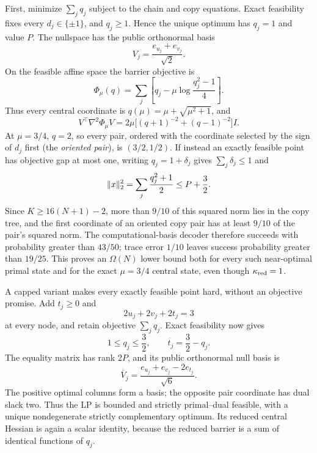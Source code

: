 First, minimize \(\sum_jq_j\) subject to the chain and copy equations.  Exact
feasibility fixes every \(d_j\in\{\pm1\}\), and \(q_j\geq1\).  Hence the
unique optimum has \(q_j=1\) and value \(P\).  The nullspace has the public
orthonormal basis
\begin{equation}
 V_j=\frac{e_{u_j}+e_{v_j}}{\sqrt2}.
\end{equation}
On the feasible affine space the barrier objective is
\begin{equation}
 \Phi_\mu(q)=\sum_j\left[q_j-
       \mu\log\frac{q_j^2-1}{4}\right].
\end{equation}
Thus every central coordinate is
\(q(\mu)=\mu+\sqrt{\mu^2+1}\), and
\begin{equation}
 V^\top\nabla^2\Phi_\mu V
 =2\mu\bigl[(q+1)^{-2}+(q-1)^{-2}\bigr]I.
\end{equation}
At \(\mu=3/4\), \(q=2\), so every pair, ordered with the coordinate selected
by the sign of \(d_j\) first (the \emph{oriented pair}), is \((3/2,1/2)\).  If instead an exactly feasible point has objective gap at
most one, writing \(q_j=1+\delta_j\) gives
\(\sum_j\delta_j\leq1\) and
\begin{equation}
 \lVert x\rVert_2^2=\sum_j\frac{q_j^2+1}{2}\leq P+\frac32.
\end{equation}
Since \(K\geq16(N+1)-2\), more than \(9/10\) of this squared norm lies in
the copy tree, and the first coordinate of an oriented copy pair has at
least \(9/10\) of the pair's squared norm.  The computational-basis decoder
therefore succeeds with probability greater than \(43/50\); trace error
\(1/10\) leaves success probability greater than \(19/25\).  This proves an
\(\Omega(N)\) lower bound both for every such near-optimal primal state and
for the exact \(\mu=3/4\) central state, even though \(\kappa_{\rm red}=1\).

A capped variant makes every exactly feasible point hard, without an
objective promise.  Add \(t_j\geq0\) and
\begin{equation}
 2u_j+2v_j+2t_j=3
\end{equation}
at every node, and retain objective \(\sum_jq_j\).  Exact feasibility now
gives
\begin{equation}
 1\leq q_j\leq\frac32,\qquad t_j=\frac32-q_j.
\end{equation}
The equality matrix has rank \(2P\), and its public orthonormal null basis is
\begin{equation}
 \bar V_j=\frac{e_{u_j}+e_{v_j}-2e_{t_j}}{\sqrt6}.
\end{equation}
The positive optimal columns form a basis; the opposite pair coordinate has
dual slack two.  Thus the LP is bounded and strictly primal--dual feasible,
with a unique nondegenerate strictly complementary optimum.  Its reduced
central Hessian is again a scalar identity, because the reduced barrier is a
sum of identical functions of \(q_j\).

